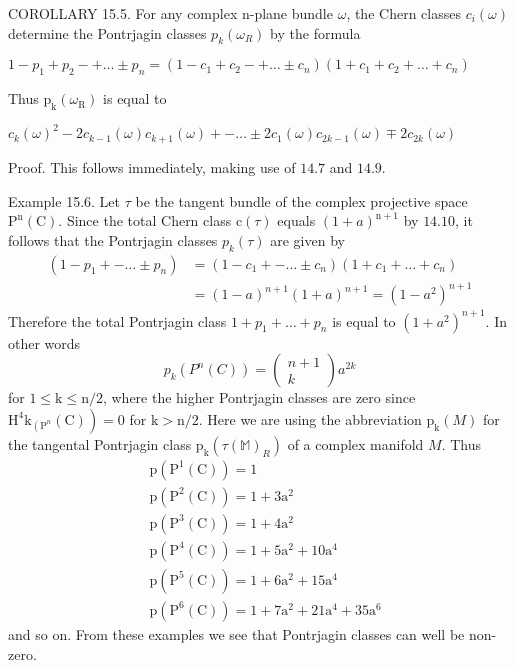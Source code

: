 \documentclass[10pt]{article}
\begin{document}
COROLLARY 15.5. For any complex n-plane bundle $\omega$, the Chern classes $c_{i}(\omega)$ determine the Pontrjagin classes $p_{k}\left(\omega_{R}\right)$ by the formula

$1-p_{1}+p_{2}-+\ldots \pm p_{n}=\left(1-c_{1}+c_{2}-+\ldots \pm c_{n}\right)\left(1+c_{1}+c_{2}+\ldots+c_{n}\right)$

Thus $\mathrm{p}_{\mathrm{k}}\left(\omega_{\mathrm{R}}\right)$ is equal to

$c_{k}(\omega)^{2}-2 c_{k-1}(\omega) c_{k+1}(\omega)+-\ldots \pm 2 c_{1}(\omega) c_{2 k-1}(\omega) \mp 2 c_{2 k}(\omega)$

Proof. This follows immediately, making use of $14.7$ and $14.9 .$

Example 15.6. Let $\tau$ be the tangent bundle of the complex projective space $\mathrm{P}^{\mathrm{n}}(\mathrm{C})$. Since the total Chern class $\mathrm{c}(\tau)$ equals $(1+a)^{\mathrm{n}+1}$ by $14.10$, it follows that the Pontrjagin classes $p_{k}(\tau)$ are given by
$$
\begin{aligned}
\left(1-p_{1}+-\ldots \pm p_{n}\right) &=\left(1-c_{1}+-\ldots \pm c_{n}\right)\left(1+c_{1}+\ldots+c_{n}\right) \\
&=(1-a)^{n+1}(1+a)^{n+1}=\left(1-a^{2}\right)^{n+1}
\end{aligned}
$$
Therefore the total Pontrjagin class $1+p_{1}+\ldots+p_{n}$ is equal to $\left(1+a^{2}\right)^{n+1}$. In other words
$$
p_{k}\left(P^{n}(C)\right)=\left(\begin{array}{c}
n+1 \\
k
\end{array}\right) a^{2 k}
$$
for $1 \leq \mathrm{k} \leq \mathrm{n} / 2$, where the higher Pontrjagin classes are zero since $\left.\mathrm{H}^{4} \mathrm{k}_{\left(\mathrm{P}^{n}\right.}(\mathrm{C})\right)=0$ for $\mathrm{k}>\mathrm{n} / 2$. Here we are using the abbreviation $\mathrm{p}_{\mathrm{k}}(M)$ for the tangental Pontrjagin class $\mathrm{p}_{\mathrm{k}}\left(\tau(\mathbb{M})_{R}\right)$ of a complex manifold $M$. Thus
$$
\begin{aligned}
&\mathrm{p}\left(\mathrm{P}^{1}(\mathrm{C})\right)=1 \\
&\mathrm{p}\left(\mathrm{P}^{2}(\mathrm{C})\right)=1+3 \mathrm{a}^{2} \\
&\mathrm{p}\left(\mathrm{P}^{3}(\mathrm{C})\right)=1+4 \mathrm{a}^{2} \\
&\mathrm{p}\left(\mathrm{P}^{4}(\mathrm{C})\right)=1+5 \mathrm{a}^{2}+10 \mathrm{a}^{4} \\
&\mathrm{p}\left(\mathrm{P}^{5}(\mathrm{C})\right)=1+6 \mathrm{a}^{2}+15 \mathrm{a}^{4} \\
&\mathrm{p}\left(\mathrm{P}^{6}(\mathrm{C})\right)=1+7 \mathrm{a}^{2}+21 \mathrm{a}^{4}+35 \mathrm{a}^{6}
\end{aligned}
$$
and so on. From these examples we see that Pontrjagin classes can well be non-zero.
\end{document}
